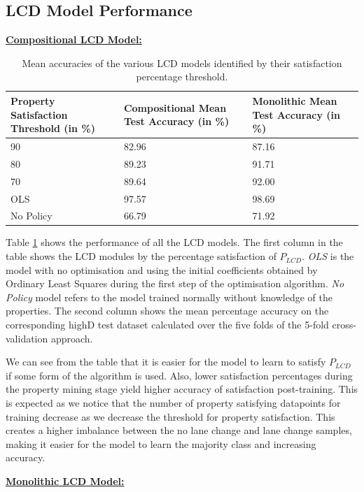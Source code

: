 \subsection{LCD Model Performance}

\textbf{\underline{Compositional LCD Model:}}\\ 
\begin{table}[htbp]
    \centering
    \begin{tabular}{|p{4cm}|p{4cm}|p{4cm}|}
    \hline
    Property Satisfaction Threshold (in \%)  & Compositional Mean Test Accuracy (in \%) &  Monolithic Mean Test Accuracy (in \%) \\
    \hline
        90 & 82.96 & 87.16 \\
        80 & 89.23 & 91.71 \\
        70 & 89.64 & 92.00 \\
        OLS & 97.57 & 98.69\\
        No Policy & 66.79 & 71.92\\
    \hline
    \end{tabular}
    \caption{Mean accuracies of the various LCD models identified by their satisfaction percentage threshold. }
    \label{tab:performance}
\end{table}

Table \ref{tab:performance} shows the performance of all the LCD models. The first column in the table shows the LCD modules by the percentage satisfaction of $P_{LCD}$. \emph{OLS} is the model with no optimisation and using the initial coefficients obtained by Ordinary Least Squares during the first step of the optimisation algorithm. \emph{No Policy} model refers to the model trained normally without knowledge of the properties. The second column shows the mean percentage accuracy on the corresponding highD test dataset calculated over the five folds of the 5-fold cross-validation approach.

We can see from the table that it is easier for the model to learn to satisfy $P_{LCD}$ if some form of the algorithm is used. Also, lower satisfaction percentages during the property mining stage yield higher accuracy of satisfaction post-training. This is expected as we notice that the number of property satisfying datapoints for training decrease as we decrease the threshold for property satisfaction. This creates a higher imbalance between the no lane change and lane change samples, making it easier for the model to learn the majority class and increasing accuracy.


\textbf{\underline{Monolithic LCD Model:}}\\ 


